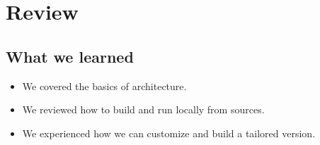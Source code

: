 \section{Review}

\subsection*{What we learned}
\begin{frame}
  \begin{itemize}
    \item[\faCheck] We covered the basics of \taoce architecture.
    \item[\faCheck] We reviewed how to build and run \taoce locally from sources.
    \item[\faCheck] We experienced how we can customize \taoce and build a tailored version.
  \end{itemize}
\end{frame}
